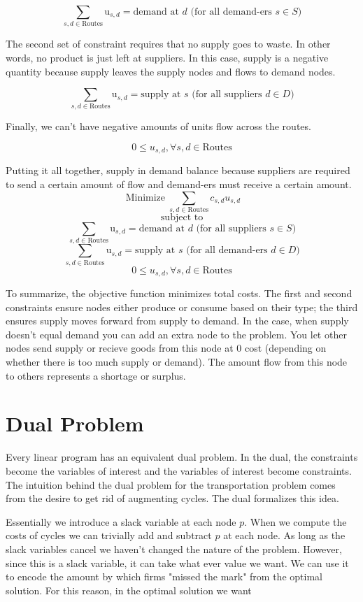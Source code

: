 \documentclass{report}
\begin{document}
$$\sum_{s,d \in \text{Routes}} \text{u}_{s,d}= \text{demand at } d \text{ (for all demand-ers } s \in S)$$

The second set of constraint requires that no supply goes to waste. In other words, no product is just left at suppliers. In this case, supply is a negative quantity because supply leaves the supply nodes and flows to demand nodes.

$$\sum_{s,d \in \text{Routes}} \text{u}_{s,d}= \text{supply at } s \text{ (for all suppliers } d \in D)$$

Finally, we can't have negative amounts of units flow across the routes.

$$0 \leq u_{s,d}, \forall s,d \in \text{Routes}$$

Putting it all together, supply in demand balance because suppliers are required to send a certain amount of flow and demand-ers must receive a certain amount.
$$\operatorname{Minimize} \sum_{s,d \in \text{Routes}} c_{s,d} u_{s,d}$$
$$\text{subject to}$$
$$\sum_{s,d \in \text{Routes}} \text{u}_{s,d}= \text{demand at } d \text{ (for all suppliers } s \in S)$$
$$\sum_{s,d \in \text{Routes}} \text{u}_{s,d}= \text{supply at } s \text{ (for all demand-ers } d \in D)$$
$$0 \leq u_{s,d}, \forall s,d \in \text{Routes}$$

To summarize, the objective function minimizes total costs. The first and second constraints ensure nodes either produce or consume based on their type; the third ensures supply moves forward from supply to demand.  In the case, when supply doesn't equal demand you can add an extra node to the problem. You let other nodes send supply or recieve goods from this node at 0 cost (depending on whether there is too much supply or demand). The amount flow from this node to others represents a shortage or surplus.


\section{Dual Problem}

Every linear program has an equivalent dual problem. In the dual, the constraints become the variables of interest and the variables of interest become constraints. The intuition behind the dual problem for the transportation problem comes from the desire to get rid of augmenting cycles. The dual formalizes this idea.

Essentially we introduce a slack variable at each node $p$. When we compute the costs of cycles we can trivially add and subtract $p$ at each node. As long as the slack variables cancel we haven't changed the nature of the problem. However, since this is a slack variable, it can take what ever value we want. We can use it to encode the amount by which firms "missed the mark" from the optimal solution. For this reason, in the optimal solution we want
\end{document}
